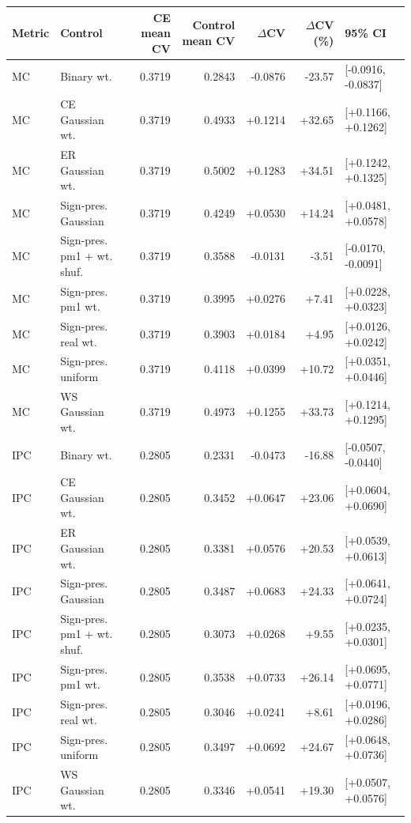 \begin{tabular}{llrrrrl}
\toprule
Metric & Control & CE mean CV & Control mean CV & $\Delta$CV & $\Delta$CV (\%) & 95\% CI \\
\midrule
MC & Binary wt. & 0.3719 & 0.2843 & -0.0876 & -23.57 & [-0.0916, -0.0837] \\
MC & CE Gaussian wt. & 0.3719 & 0.4933 & +0.1214 & +32.65 & [+0.1166, +0.1262] \\
MC & ER Gaussian wt. & 0.3719 & 0.5002 & +0.1283 & +34.51 & [+0.1242, +0.1325] \\
MC & Sign-pres. Gaussian & 0.3719 & 0.4249 & +0.0530 & +14.24 & [+0.0481, +0.0578] \\
MC & Sign-pres. pm1 + wt. shuf. & 0.3719 & 0.3588 & -0.0131 & -3.51 & [-0.0170, -0.0091] \\
MC & Sign-pres. pm1 wt. & 0.3719 & 0.3995 & +0.0276 & +7.41 & [+0.0228, +0.0323] \\
MC & Sign-pres. real wt. & 0.3719 & 0.3903 & +0.0184 & +4.95 & [+0.0126, +0.0242] \\
MC & Sign-pres. uniform & 0.3719 & 0.4118 & +0.0399 & +10.72 & [+0.0351, +0.0446] \\
MC & WS Gaussian wt. & 0.3719 & 0.4973 & +0.1255 & +33.73 & [+0.1214, +0.1295] \\
IPC & Binary wt. & 0.2805 & 0.2331 & -0.0473 & -16.88 & [-0.0507, -0.0440] \\
IPC & CE Gaussian wt. & 0.2805 & 0.3452 & +0.0647 & +23.06 & [+0.0604, +0.0690] \\
IPC & ER Gaussian wt. & 0.2805 & 0.3381 & +0.0576 & +20.53 & [+0.0539, +0.0613] \\
IPC & Sign-pres. Gaussian & 0.2805 & 0.3487 & +0.0683 & +24.33 & [+0.0641, +0.0724] \\
IPC & Sign-pres. pm1 + wt. shuf. & 0.2805 & 0.3073 & +0.0268 & +9.55 & [+0.0235, +0.0301] \\
IPC & Sign-pres. pm1 wt. & 0.2805 & 0.3538 & +0.0733 & +26.14 & [+0.0695, +0.0771] \\
IPC & Sign-pres. real wt. & 0.2805 & 0.3046 & +0.0241 & +8.61 & [+0.0196, +0.0286] \\
IPC & Sign-pres. uniform & 0.2805 & 0.3497 & +0.0692 & +24.67 & [+0.0648, +0.0736] \\
IPC & WS Gaussian wt. & 0.2805 & 0.3346 & +0.0541 & +19.30 & [+0.0507, +0.0576] \\
\bottomrule
\end{tabular}
